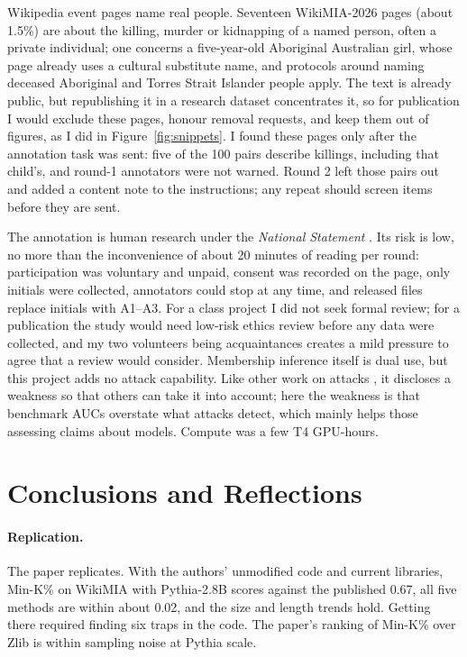 \documentclass[11pt]{article}
\begin{document}
Wikipedia event pages name real people. Seventeen WikiMIA-2026 pages (about 1.5\%) are about the killing, murder or kidnapping of a named person, often a private individual; one concerns a five-year-old Aboriginal Australian girl, whose page already uses a cultural substitute name, and protocols around naming deceased Aboriginal and Torres Strait Islander people apply. The text is already public, but republishing it in a research dataset concentrates it, so for publication I would exclude these pages, honour removal requests, and keep them out of figures, as I did in Figure~\ref{fig:snippets}. I found these pages only after the annotation task was sent: five of the 100 pairs describe killings, including that child's, and round-1 annotators were not warned. Round 2 left those pairs out and added a content note to the instructions; any repeat should screen items before they are sent.

The annotation is human research under the \emph{National Statement} \citep{nationalstatement2025}. Its risk is low, no more than the inconvenience of about 20 minutes of reading per round: participation was voluntary and unpaid, consent was recorded on the page, only initials were collected, annotators could stop at any time, and released files replace initials with A1--A3. For a class project I did not seek formal review; for a publication the study would need low-risk ethics review before any data were collected, and my two volunteers being acquaintances creates a mild pressure to agree that a review would consider. Membership inference itself is dual use, but this project adds no attack capability. Like other work on attacks \citep{li2024seeing}, it discloses a weakness so that others can take it into account; here the weakness is that benchmark AUCs overstate what attacks detect, which mainly helps those assessing claims about models. Compute was a few T4 GPU-hours.
\section{Conclusions and Reflections}
\label{sec:conclusion}

\paragraph{Replication.} The paper replicates. With the authors' unmodified code and current libraries, Min-K\% on WikiMIA with Pythia-2.8B scores \RepMinK{} against the published 0.67, all five methods are within about 0.02, and the size and length trends hold. Getting there required finding six traps in the code. The paper's ranking of Min-K\% over Zlib is within sampling noise at Pythia scale.
\end{document}
